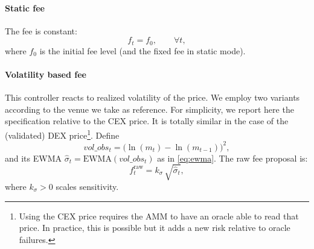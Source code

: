 \documentclass[11pt]{article}
\begin{document}
\paragraph{Static fee}
The fee is constant:
\begin{equation}
  f_t = f_0, \qquad \forall t,
  \label{eq:static-fee}
\end{equation}
where $f_0$ is the initial fee level (and the fixed fee in static mode).

\paragraph{Volatility based fee}
This controller reacts to realized volatility of the price. We employ two variants according to the venue we take as reference. For simplicity, we report here the specification relative to the CEX price. It is totally similar in the case of the (validated) DEX price\footnote{Using the CEX price requires the AMM to have an oracle able to read that price. In practice, this is possible but it adds a new risk relative to oracle failures.}.
Define 
\begin{equation}
  vol\_obs_t = \bigl(\ln(m_t) - \ln(m_{t-1})\bigr)^2,
\end{equation}
and its EWMA $\hat{\sigma}_t = \mathrm{EWMA}(vol\_obs_t)$ as in \eqref{eq:ewma}.
The raw fee proposal is:
\begin{equation}
  f^{\mathrm{raw}}_t = k_{\sigma}\, \sqrt{\hat{\sigma}_t},
  \label{eq:vol-fee}
\end{equation}
where $k_{\sigma}>0$ scales sensitivity.
\end{document}
